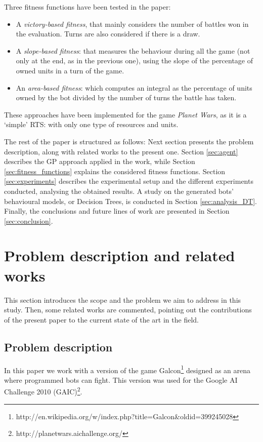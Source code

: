 \documentclass[preprint]{elsarticle}
\begin{document}
Three fitness functions have been tested in the paper:
\begin{itemize}
\item A {\em victory-based fitness}, that mainly considers the number of battles won in the evaluation. Turns are also considered if there is a draw.
\item A {\em slope-based fitness}: that measures the behaviour during all the game (not only at the end, as in the previous one), using the slope of the percentage of owned units in a turn of the game.
\item An {\em area-based fitness}: which computes an integral as the percentage of units owned by the bot divided by the number of turns the battle has taken. 
\end{itemize}

These approaches have been implemented for the game {\em Planet Wars}, as it is a `simple' RTS: with only one type of resources and units.
 
The rest of the paper is structured as follows: Next section presents the problem description, along with related works to the present one. Section \ref{sec:agent} describes the GP approach applied in the work, while Section \ref{sec:fitness_functions} explains the considered fitness functions. Section \ref{sec:experiments} describes the experimental setup and the different experiments conducted, analysing the obtained results. A study on the generated bots' behavioural models, or Decision Trees, is conducted in Section \ref{sec:analysis_DT}. Finally, the conclusions and future lines of work are presented in Section \ref{sec:conclusion}.



\section{Problem description and related works}
\label{section:problem_sota}

This section introduces the scope and the problem we aim to address in this study. Then, some related works are commented, pointing out the contributions of the present paper to the current state of the art in the field.

\subsection{Problem description}
In this paper we work with a version of the game Galcon\footnote{http://en.wikipedia.org/w/index.php?title=Galcon\&oldid=399245028} designed as an arena where programmed bots
can fight. This version was used for the Google AI Challenge 2010
(GAIC)\footnote{http://planetwars.aichallenge.org/}. 
\end{document}
